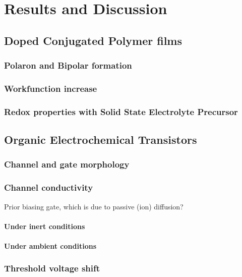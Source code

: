 \chapter{Results and Discussion}
\label{cha:3}

\section{Doped Conjugated Polymer films}
\subsection{Polaron and Bipolar formation}

\subsection{Workfunction increase}

\subsection{Redox properties with Solid State Electrolyte Precursor}


\section{Organic Electrochemical Transistors}
\subsection{Channel and gate morphology}

\subsection{Channel conductivity}

Prior biasing gate, which is due to passive (ion) diffusion?
\subsubsection{Under inert conditions}

\subsubsection{Under ambient conditions}

\subsection{Threshold voltage shift}

